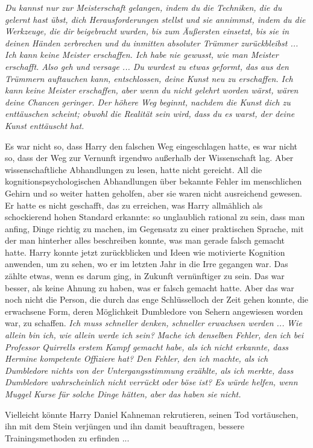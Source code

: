 \emph{Du kannst nur zur Meisterschaft gelangen, indem du die Techniken, die du
gelernt hast übst, dich Herausforderungen stellst und sie annimmst, indem du die
Werkzeuge, die dir beigebracht wurden, bis zum Äußersten einsetzt, bis sie in
deinen Händen zerbrechen und du inmitten absoluter Trümmer zurückbleibst ... Ich
kann keine Meister erschaffen. Ich habe nie gewusst, wie man Meister erschafft.
Also geh und versage ... Du wurdest zu etwas geformt, das aus den Trümmern
auftauchen kann, entschlossen, deine Kunst neu zu erschaffen. Ich kann keine
Meister erschaffen, aber wenn du nicht gelehrt worden wärst, wären deine Chancen
geringer. Der höhere Weg beginnt, nachdem die Kunst dich zu enttäuschen scheint;
obwohl die Realität sein wird, dass du es warst, der deine Kunst enttäuscht
hat.}

Es war nicht so, dass Harry den falschen Weg eingeschlagen hatte, es war nicht
so, dass der Weg zur Vernunft irgendwo außerhalb der Wissenschaft lag. Aber
wissenschaftliche Abhandlungen zu lesen, hatte nicht gereicht. All die
kognitionspsychologischen Abhandlungen über bekannte Fehler im menschlichen
Gehirn und so weiter hatten geholfen, aber sie waren nicht ausreichend gewesen.
Er hatte es nicht geschafft, das zu erreichen, was Harry allmählich als
schockierend hohen Standard erkannte: so unglaublich rational zu sein, dass man
anfing, Dinge richtig zu machen, im Gegensatz zu einer praktischen Sprache, mit
der man hinterher alles beschreiben konnte, was man gerade falsch gemacht hatte.
Harry konnte jetzt zurückblicken und Ideen wie \glqq{}motivierte Kognition\grqq{}
anwenden, um zu sehen, wo er im letzten Jahr in die Irre gegangen war. Das
zählte etwas, wenn es darum ging, in Zukunft vernünftiger zu sein. Das war
besser, als keine Ahnung zu haben, was er falsch gemacht hatte. Aber das war
noch nicht die Person, die durch das enge Schlüsselloch der Zeit gehen konnte,
die erwachsene Form, deren Möglichkeit Dumbledore von Sehern angewiesen worden
war, zu schaffen. \emph{ Ich muss schneller denken, schneller erwachsen
werden ...}
\emph{Wie allein bin ich, wie allein werde ich sein?}
\emph{Mache ich denselben Fehler, den ich bei Professor Quirrells erstem Kampf
gemacht habe, als ich nicht erkannte, dass Hermine kompetente Offiziere hat? Den
Fehler, den ich machte, als ich Dumbledore nichts von der Untergangsstimmung
erzählte, als ich merkte, dass Dumbledore wahrscheinlich nicht verrückt oder
böse ist? Es würde helfen, wenn Muggel Kurse für solche Dinge hätten, aber das
haben sie nicht.}

Vielleicht könnte Harry Daniel Kahneman rekrutieren, seinen Tod vortäuschen, ihn
mit dem Stein verjüngen und ihn damit beauftragen, bessere Trainingsmethoden zu
erfinden ...

